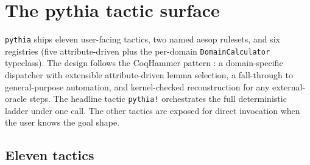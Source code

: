 \section{The pythia tactic surface}
\label{sec:tactic-surface}

\texttt{pythia} ships eleven user-facing tactics, two named aesop
rulesets, and six registries (five attribute-driven plus the
per-domain \texttt{DomainCalculator} typeclass). The design follows
the CoqHammer pattern \citep{czajkakaliszyk2018coqhammer}: a
domain-specific dispatcher with extensible attribute-driven lemma
selection, a fall-through to general-purpose automation, and
kernel-checked reconstruction for any external-oracle steps. The
headline tactic \texttt{pythia!} orchestrates the full
deterministic ladder under one call. The other tactics are
exposed for direct invocation when the user knows the goal shape.

\subsection{Eleven tactics}
\label{sec:tactic-surface-ten}

